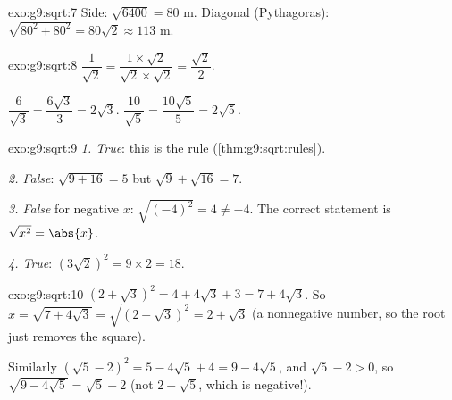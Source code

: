 \begin{solution}{exo:g9:sqrt:7}
Side: $\sqrt{6400} = 80$ m. Diagonal (Pythagoras):
$\sqrt{80^2 + 80^2} = 80\sqrt2 \approx 113$ m.
\end{solution}

\begin{solution}{exo:g9:sqrt:8}
$\dfrac{1}{\sqrt2} = \dfrac{1 \times \sqrt2}{\sqrt2 \times \sqrt2}
= \dfrac{\sqrt2}{2}$.

$\dfrac{6}{\sqrt3} = \dfrac{6\sqrt3}{3} = 2\sqrt3$.
\quad
$\dfrac{10}{\sqrt5} = \dfrac{10\sqrt5}{5} = 2\sqrt5$.
\end{solution}

\begin{solution}{exo:g9:sqrt:9}
\emph{1. True}: this is the  rule (\cref{thm:g9:sqrt:rules}).

\emph{2. False}: $\sqrt{9 + 16} = 5$ but $\sqrt9 + \sqrt{16} = 7$.

\emph{3. False} for negative $x$: $\sqrt{(-4)^2} = 4 \neq -4$. The
correct statement is $\sqrt{x^2} = \abs{x}$.

\emph{4. True}: $\left(3\sqrt2\right)^2 = 9 \times 2 = 18$.
\end{solution}

\begin{solution}{exo:g9:sqrt:10}
$\left(2 + \sqrt3\right)^2 = 4 + 4\sqrt3 + 3 = 7 + 4\sqrt3$. So
$x = \sqrt{7 + 4\sqrt3} = \sqrt{\left(2+\sqrt3\right)^2} = 2 + \sqrt3$
(a nonnegative number, so the root just removes the square).

Similarly $\left(\sqrt5 - 2\right)^2 = 5 - 4\sqrt5 + 4 = 9 - 4\sqrt5$,
and $\sqrt5 - 2 > 0$, so
$\sqrt{9 - 4\sqrt5} = \sqrt5 - 2$ (not $2 - \sqrt5$, which is
negative!).
\end{solution}

